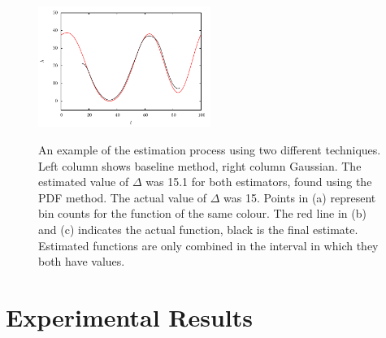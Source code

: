 \documentclass[a4paper,11pt]{article}
\begin{document}
\begin{figure}[]
{   \includegraphics[width=0.5\textwidth]{images/comb_gauss}
   }

   \caption{An example of the estimation process using two different
   techniques. Left column shows baseline method, right column Gaussian. The
   estimated value of $\Delta$ was 15.1 for both estimators, found using the PDF
   method. The actual value of $\Delta$ was 15. Points in (a) represent bin
   counts for the function of the same colour. The red line in (b) and (c)
   indicates the actual function, black is the final estimate. Estimated
   functions are only combined in the interval in which they both have values.}

   \label{fig:finest}
   \end{figure}
\section{Experimental Results}
\label{sec-5}
\end{document}
